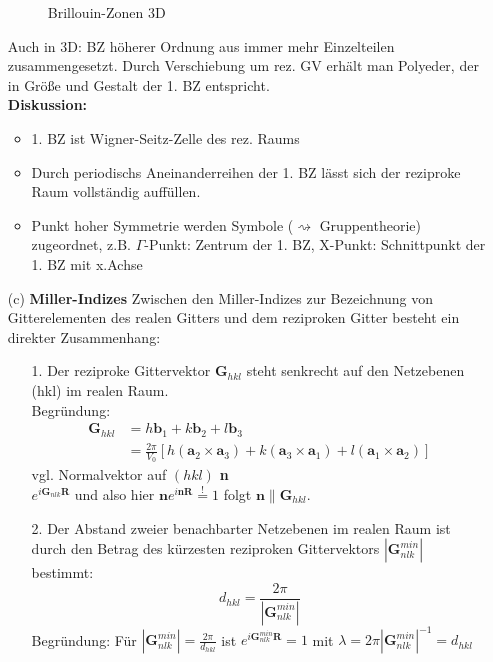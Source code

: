 \begin{itemize}
\begin{figure}[H]
              \caption{Brillouin-Zonen 3D}
              \label{}
          \end{figure}
          Auch in 3D: BZ höherer Ordnung aus immer mehr Einzelteilen zusammengesetzt. Durch Verschiebung um rez. GV erhält man Polyeder, der in Größe und Gestalt der 1. BZ entspricht.\\
          \textbf{Diskussion:}
          \begin{itemize}
              \item 1. BZ ist Wigner-Seitz-Zelle des rez. Raums
              \item Durch periodischs Aneinanderreihen der 1. BZ lässt sich der reziproke Raum vollständig auffüllen.
              \item Punkt hoher Symmetrie werden Symbole ($\rightsquigarrow$ Gruppentheorie) zugeordnet, z.B. $\Gamma$-Punkt: Zentrum der 1. BZ, X-Punkt: Schnittpunkt der 1. BZ mit x.Achse
          \end{itemize}
    \item[(c)] \textbf{Miller-Indizes}
          Zwischen den Miller-Indizes zur Bezeichnung von Gitterelementen des realen Gitters und dem reziproken Gitter besteht ein direkter Zusammenhang:\\
          \begin{itemize}
              \item[1.] Der reziproke Gittervektor $\textbf{G}_{hkl}$ steht senkrecht auf den Netzebenen (hkl) im realen Raum.\\
                    Begründung:
                    \begin{align*}
                        \textbf{G}_{hkl} & = h \textbf{b}_1 + k \textbf{b}_2 + l \textbf{b}_3\\
                        & =\frac{2 \pi}{V_0}\left[h(\textbf{a}_2\times \textbf{a}_3) + k(\textbf{a}_3\times \textbf{a}_1) + l(\textbf{a}_1\times \textbf{a}_2)\right]
                    \end{align*}
                    vgl. Normalvektor auf $(hkl)$ \textbf{n}\\
                    $e^{i \textbf{G}_{nlk}\textbf{R}}$ und also hier $\textbf{n} e^{i \textbf{n} \textbf{R}} \overset{!}{=}1$ folgt $\textbf{n} \parallel \textbf{G}_{hkl}$.
              \item[2.] Der Abstand zweier benachbarter Netzebenen im realen Raum ist durch den Betrag des kürzesten reziproken Gittervektors $\left| \textbf{G}_{nlk}^{min} \right|$ bestimmt:
              $$d_{hkl} = \frac{2 \pi}{\left| \textbf{G}_{nlk}^{min} \right|} $$
              Begründung: Für $\left| \textbf{G}_{nlk}^{min} \right| = \frac{2 \pi}{d_{hkl}}$ ist $e^{i \textbf{G}_{nlk}^{min} \textbf{R}} = 1$ mit $\lambda = 2 \pi \left| \textbf{G}_{nlk}^{min} \right|^{-1} = d_{hkl}$
          \end{itemize}
\end{itemize}



